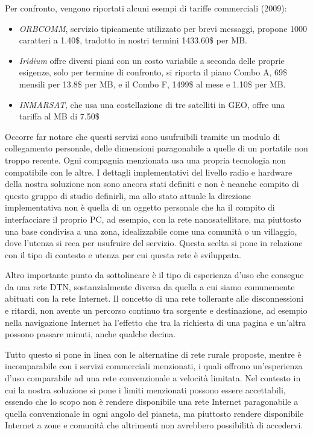 \documentclass[a4paper]{article}
\begin{document}
		
		Per confronto, vengono riportati alcuni esempi di tariffe commerciali (2009):
		\begin{itemize}
			\item {\it ORBCOMM}, servizio tipicamente utilizzato per brevi messaggi, propone 1000 caratteri a 1.40\$, tradotto in nostri termini 1433.60\$ per MB.
			\item {\it Iridium} offre diversi piani con un costo variabile a seconda delle proprie esigenze, solo per termine di confronto, si riporta il piano Combo A, 69\$ mensili per 13.8\$ per MB, e il Combo F, 1499\$ al mese e 1.10\$ per MB.
			\item {\it INMARSAT}, che usa una costellazione di tre satelliti in GEO, offre una tariffa al MB di 7.50\$
		\end{itemize}
		Occorre far notare che questi servizi sono usufruibili tramite un modulo di collegamento personale, delle dimensioni paragonabile a quelle di un portatile non troppo recente. Ogni compagnia menzionata usa una propria tecnologia non compatibile con le altre. I dettagli implementativi del livello radio e hardware della nostra soluzione non sono ancora stati definiti e non è neanche compito di questo gruppo di studio definirli, ma allo stato attuale la direzione implementativa non è quella di un oggetto personale che ha il compito di interfacciare il proprio PC, ad esempio, con la rete nanosatellitare, ma piuttosto una base condivisa a una zona, idealizzabile come una comunità o un villaggio, dove l'utenza si reca per usufruire del servizio. Questa scelta si pone in relazione con il tipo di contesto e utenza per cui questa rete è sviluppata. 
		
		Altro importante punto da sottolineare è il tipo di esperienza d'uso che consegue da una rete DTN, sostanzialmente diversa da quella a cui siamo comunemente abituati con la rete Internet. Il concetto di una rete tollerante alle disconnessioni e ritardi, non avente un percorso continuo tra sorgente e destinazione, ad esempio nella navigazione Internet ha l'effetto che tra la richiesta di una pagina e un'altra possono passare minuti, anche qualche decina. 
		
		Tutto questo si pone in linea con le alternatine di rete rurale proposte, mentre è incomparabile con i servizi commerciali menzionati, i quali offrono un'esperienza d'uso comparabile ad una rete convenzionale a velocità limitata. Nel contesto in cui la nostra soluzione si pone i limiti menzionati possono essere accettabili, essendo che lo scopo non è rendere disponibile una rete Internet paragonabile a quella convenzionale in ogni angolo del pianeta, ma piuttosto rendere disponibile Internet a zone e comunità che altrimenti non avrebbero possibilità di accedervi.
		
\end{document}
